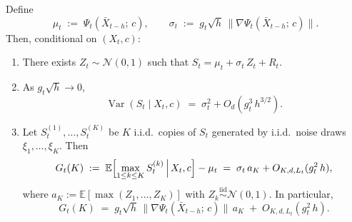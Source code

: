 \begin{theorem}
\label{thm:loc-scale}
Define
\begin{equation}
  \mu_t \;:=\; \Psi_t(\bar{X}_{t-h};\, c),
  \qquad
  \sigma_t \;:=\; g_t\sqrt{h}\,\|\nabla\Psi_t(\bar{X}_{t-h};\, c)\|.
  \label{eq:mu-sigma-sde}
\end{equation}
Then, conditional on $(X_t, c)$:
\begin{enumerate}
\item[\textbf{(i)}]
  There exists $Z_t \sim \mathcal{N}(0,1)$ such that
  $S_t = \mu_t + \sigma_t\,Z_t + R_t$.
\item[\textbf{(ii)}]
  As $g_t\sqrt{h} \to 0$,
  \begin{equation}
    \operatorname{Var}(S_t \mid X_t, c)
    \;=\; \sigma_t^2 + O_d(g_t^3\,h^{3/2}).
    \label{eq:var-approx}
  \end{equation}
\item[\textbf{(iii)}]
  Let $S_t^{(1)}, \ldots, S_t^{(K)}$ be $K$ i.i.d.\ copies of $S_t$
  generated by i.i.d.\ noise draws $\xi_1, \ldots, \xi_K$.
  Then
  \begin{equation}
    G_t(K)
    \;:=\; \mathbb{E}\Bigl[\max_{1 \le k \le K} S_t^{(k)}
           \,\Big|\, X_t, c\Bigr] - \mu_t
    \;=\; \sigma_t\,a_K + O_{K,d,L_t}(g_t^2\,h),
    \label{eq:gain-sde}
  \end{equation}
  where $a_K := \mathbb{E}[\max(Z_1, \ldots, Z_K)]$ with
  $Z_k \stackrel{\mathrm{iid}}{\sim} \mathcal{N}(0,1)$.
  In particular,
  \begin{equation}
    G_t(K) \;=\; g_t\sqrt{h}\,\|\nabla\Psi_t(\bar{X}_{t-h};\, c)\|\,a_K
              \;+\; O_{K,d,L_t}(g_t^2\,h).
    \label{eq:gain-explicit}
  \end{equation}
\end{enumerate}
\end{theorem}

